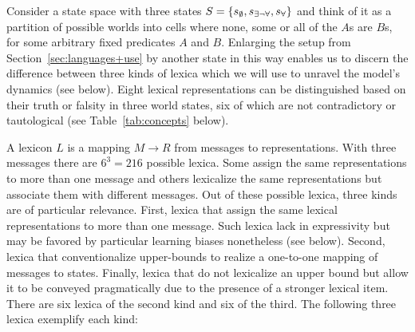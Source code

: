 \documentclass[a4paper, 11pt]{article}
\theoremstyle{Satz}
\newcommand{\set}[1]{\left\{#1\right\}}
\newcommand{\States}{\ensuremath{S}\xspace}		%
\newcommand{\state}{\ensuremath{s}\xspace}		%
\newcommand{\mystate}[1]{\ensuremath{\state_{\text{#1}}}\xspace} %
\newcommand{\Messgs}{\ensuremath{M}\xspace}		%
\newcommand{\ssome}{\mystate{\ensuremath{\exists\neg\forall}}}
\newcommand{\sall}{\mystate{\ensuremath{\forall}}}
\newcommand{\snone}{\mystate{\ensuremath{\emptyset}}}
\begin{document}
Consider a state space with three states $\States = \set{\snone, \ssome, \sall}$ and think of
it as a partition of possible worlds into cells where none, some or all of the $A$s are $B$s,
for some arbitrary fixed predicates $A$ and $B$. Enlarging the setup from Section~\ref{sec:languages+use} by another state in this way enables us to discern the difference between three kinds of lexica which we will use to unravel the model's dynamics (see below). Eight lexical representations can be distinguished based on their truth or falsity in three world states, six of which are not contradictory or tautological (see Table~\ref{tab:concepts} below).

A lexicon $L$ is a mapping $\Messgs \rightarrow R$ from messages to representations. With three
messages there are $6^3 = 216$ possible lexica. Some assign the same representations to more
than one message and others lexicalize the same representations but associate them with
different messages. Out of these possible lexica, three kinds are of particular
relevance. First, lexica that assign the same lexical representations to more than one
message. Such lexica lack in expressivity but may be favored by particular learning biases
nonetheless (see below). Second, lexica that conventionalize upper-bounds to realize a
one-to-one mapping of messages to states. Finally, lexica that do not lexicalize an upper
bound but allow it to be conveyed pragmatically due to the presence of a stronger lexical
item. There are six lexica of the second kind and six of the third.  The following three lexica
exemplify each kind:
\end{document}
